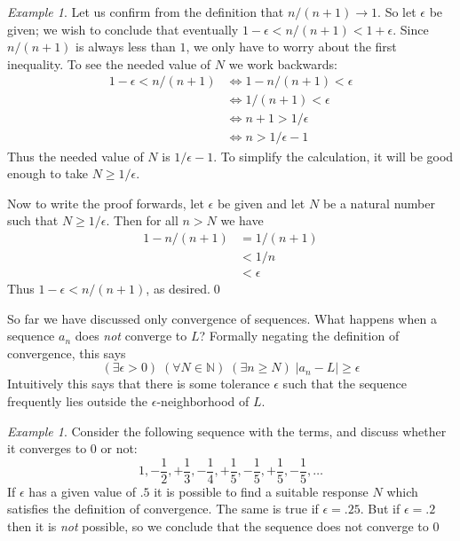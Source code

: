 \documentclass[11pt,oneside]{amsbook}
\newcommand{\N}{\mathbb N}
\theoremstyle{definition}
\theoremstyle{plain}
\theoremstyle{definition}
\theoremstyle{remark}
\newtheorem{example}[theorem]{Example}
\numberwithin{equation}{section}
\numberwithin{figure}{section}
\begin{document}
\begin{example}
  Let us confirm from the definition that $n/(n+1)\to1$. So let $\epsilon$ be given; we wish to conclude that eventually $1-\epsilon<n/(n+1)<1+\epsilon$. Since $n/(n+1)$ is always less than $1$, we only have to worry about the first inequality. To see the needed value of $N$ we work backwards:
  \begin{align*}
    1-\epsilon<n/(n+1)&\iff 1-n/(n+1)<\epsilon \\
                      &\iff 1/(n+1)<\epsilon \\
                      &\iff n+1>1/\epsilon \\
                      &\iff n>1/\epsilon-1
  \end{align*}
  Thus the needed value of $N$ is $1/\epsilon-1$. To simplify the calculation, it will be good enough to take $N\geq 1/\epsilon$.
  
  Now to write the proof forwards, let $\epsilon$ be given and let $N$ be a natural number such that $N\geq 1/\epsilon$. Then for all $n>N$ we have
  \begin{align*}
    1-n/(n+1) &= 1/(n+1)\\
              &< 1/n\\
              &<\epsilon
  \end{align*}
  Thus $1-\epsilon < n/(n+1)$, as desired.\qed
\end{example}


So far we have discussed only convergence of sequences. What happens when a sequence $a_n$ does \emph{not} converge to $L$? Formally negating the definition of convergence, this says
\[(\exists\epsilon>0)\;(\forall N\in\N)\;(\exists n\geq N)\;|a_n-L|\geq\epsilon
\]
Intuitively this says that there is some tolerance $\epsilon$ such that the sequence frequently lies outside the $\epsilon$-neighborhood of $L$.

\begin{example}
  Consider the following sequence with the terms, and discuss whether it converges to $0$ or not:
  \[1,-\frac12,+\frac13,-\frac14,+\frac15,-\frac15,+\frac15,-\frac15,\ldots
  \]
  If $\epsilon$ has a given value of $.5$ it is possible to find a suitable response $N$ which satisfies the definition of convergence. The same is true if $\epsilon=.25$. But if $\epsilon=.2$ then it is \emph{not} possible, so we conclude that the sequence does not converge to $0$
\end{example}
\end{document}
